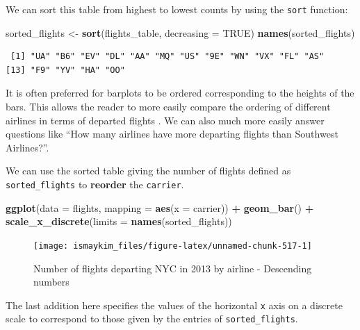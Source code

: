\documentclass[12pt,]{krantz}
\makeatletter
\newenvironment{Shaded}{\begin{snugshade}}{\end{snugshade}}
\newcommand{\KeywordTok}[1]{\textcolor[rgb]{0.27,0.27,0.27}{\textbf{#1}}}
\newcommand{\DataTypeTok}[1]{\textcolor[rgb]{0.27,0.27,0.27}{#1}}
\newcommand{\StringTok}[1]{\textcolor[rgb]{0.5,0.5,0.5}{#1}}
\newcommand{\OtherTok}[1]{\textcolor[rgb]{0.37,0.37,0.37}{#1}}
\newcommand{\OperatorTok}[1]{\textcolor[rgb]{0.43,0.43,0.43}{\textbf{#1}}}
\newcommand{\NormalTok}[1]{#1}
\newenvironment{kframe}{%
\medskip{}
\setlength{\fboxsep}{.8em}
 \def\at@end@of@kframe{}%
 \ifinner\ifhmode%
  \def\at@end@of@kframe{\end{minipage}}%
  \begin{minipage}{\columnwidth}%
 \fi\fi%
 \def\FrameCommand##1{\hskip\@totalleftmargin \hskip-\fboxsep
 \colorbox{shadecolor}{##1}\hskip-\fboxsep
     \hskip-\linewidth \hskip-\@totalleftmargin \hskip\columnwidth}%
 \MakeFramed {\advance\hsize-\width
   \@totalleftmargin\z@ \linewidth\hsize
   \@setminipage}}%
 {\par\unskip\endMakeFramed%
 \at@end@of@kframe}
\renewenvironment{Shaded}{\begin{kframe}}{\end{kframe}}
\theoremstyle{definition}
\theoremstyle{definition}
\theoremstyle{definition}
\theoremstyle{remark}
\makeatother
\begin{document}
We can sort this table from highest to lowest counts by using the
\texttt{sort} function:

\begin{Shaded}
\begin{Highlighting}[]
\NormalTok{sorted_flights <-}\StringTok{ }\KeywordTok{sort}\NormalTok{(flights_table, }\DataTypeTok{decreasing =} \OtherTok{TRUE}\NormalTok{)}
\KeywordTok{names}\NormalTok{(sorted_flights)}
\end{Highlighting}
\end{Shaded}

\begin{verbatim}
 [1] "UA" "B6" "EV" "DL" "AA" "MQ" "US" "9E" "WN" "VX" "FL" "AS"
[13] "F9" "YV" "HA" "OO"
\end{verbatim}

It is often preferred for barplots to be ordered corresponding to the
heights of the bars. This allows the reader to more easily compare the
ordering of different airlines in terms of departed flights
\citep{robbins2013}. We can also much more easily answer questions like
``How many airlines have more departing flights than Southwest
Airlines?''.

We can use the sorted table giving the number of flights defined as
\texttt{sorted\_flights} to \textbf{reorder} the \texttt{carrier}.

\begin{Shaded}
\begin{Highlighting}[]
\KeywordTok{ggplot}\NormalTok{(}\DataTypeTok{data =}\NormalTok{ flights, }\DataTypeTok{mapping =} \KeywordTok{aes}\NormalTok{(}\DataTypeTok{x =}\NormalTok{ carrier)) }\OperatorTok{+}
\StringTok{  }\KeywordTok{geom_bar}\NormalTok{() }\OperatorTok{+}
\StringTok{  }\KeywordTok{scale_x_discrete}\NormalTok{(}\DataTypeTok{limits =} \KeywordTok{names}\NormalTok{(sorted_flights))}
\end{Highlighting}
\end{Shaded}

\begin{figure}

{\centering \texttt{[image: ismaykim\_files/figure-latex/unnamed-chunk-517-1]} 

}

\caption{Number of flights departing NYC in 2013 by airline - Descending numbers}\label{fig:unnamed-chunk-517}
\end{figure}

The last addition here specifies the values of the horizontal \texttt{x}
axis on a discrete scale to correspond to those given by the entries of
\texttt{sorted\_flights}.
\end{document}
